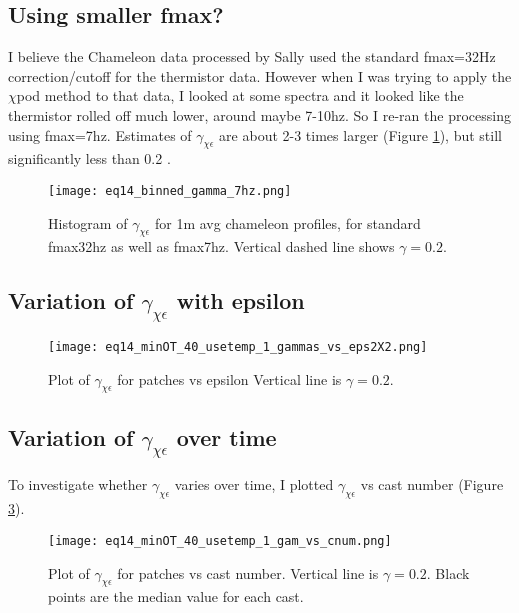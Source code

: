 \documentclass[11pt]{article}
\begin{document}
\clearpage
\subsection{Using smaller fmax?}

I believe the Chameleon data processed by Sally used the standard fmax=32Hz correction/cutoff for the thermistor data. However when I was trying to apply the $\chi$pod method to that data, I looked at some spectra and it looked like the thermistor rolled off much lower, around maybe 7-10hz. So I re-ran the processing using fmax=7hz. Estimates of $\gamma_{\chi\epsilon}$ are about 2-3 times larger (Figure \ref{avggam7hz}), but still significantly less than 0.2 .

\begin{figure}[htbp]
\texttt{[image: eq14\_binned\_gamma\_7hz.png]}
\caption{Histogram of $\gamma_{\chi\epsilon}$ for 1m avg chameleon profiles, for standard fmax32hz as well as fmax7hz. Vertical dashed line shows $\gamma=0.2$.}
\label{avggam7hz}
\end{figure}


\clearpage
\subsection{Variation of $\gamma_{\chi\epsilon}$ with epsilon}

\begin{figure}[htbp]
\texttt{[image: eq14\_minOT\_40\_usetemp\_1\_gammas\_vs\_eps2X2.png]}
\caption{Plot of $\gamma_{\chi\epsilon}$ for patches vs epsilon Vertical line is $\gamma=0.2$.}
\label{gamvscnum}
\end{figure}




\clearpage
\subsection{Variation of $\gamma_{\chi\epsilon}$ over time}

To investigate whether $\gamma_{\chi\epsilon}$ varies over time, I plotted $\gamma_{\chi\epsilon}$ vs cast number (Figure \ref{gamvscnum}).

\begin{figure}[htbp]
\texttt{[image: eq14\_minOT\_40\_usetemp\_1\_gam\_vs\_cnum.png]}
\caption{Plot of $\gamma_{\chi\epsilon}$ for patches vs cast number. Vertical line is $\gamma=0.2$. Black points are the median value for each cast.}
\label{gamvscnum}
\end{figure}
\end{document}
